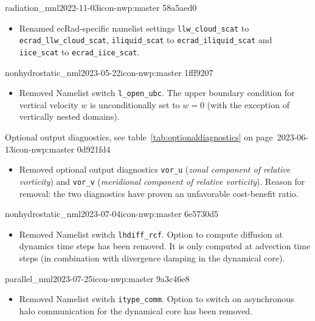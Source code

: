 \begin{changeitem}{radiation\_nml}{2022-11-03}{icon-nwp:master 58a5aed0}
  \begin{itemize}
   \item Renamed ecRad-specific namelist settings \texttt{llw\_cloud\_scat} to \texttt{ecrad\_llw\_cloud\_scat}, \texttt{iliquid\_scat} to \texttt{ecrad\_iliquid\_scat} and \texttt{iice\_scat} to \texttt{ecrad\_iice\_scat}.
  \end{itemize}
\end{changeitem}

\begin{changeitem}{nonhydrostatic\_nml}{2023-05-22}{icon-nwp:master 1fff9207}
  \begin{itemize}
   \item Removed Namelist switch \texttt{l\_open\_ubc}. The upper boundary condition for vertical velocity $w$ is unconditionally set to $w=0$ (with the exception of vertically nested domains).
  \end{itemize}
\end{changeitem}

\begin{changeitem}{Optional output diagnostics, see table~\ref{tab:optionaldiagnostics} on page~\pageref{tab:optionaldiagnostics}}{2023-06-13}{icon-nwp:master 0d921fd4}
  \begin{itemize}
   \item Removed optional output diagnostics \texttt{vor\_u} (\emph{zonal component of relative vorticity}) and \texttt{vor\_v} (\emph{meridional component of relative vorticity}).
   Reason for removal: the two diagnostics have proven an unfavorable cost-benefit ratio.
  \end{itemize}
\end{changeitem}

\begin{changeitem}{nonhydrostatic\_nml}{2023-07-04}{icon-nwp:master 6e5730d5}
  \begin{itemize}
   \item Removed Namelist switch \texttt{lhdiff\_rcf}. Option to compute diffusion at dynamics time steps has been removed. It is only computed at advection time steps (in combination with divergence damping in the dynamical core).
  \end{itemize}
\end{changeitem}

\begin{changeitem}{parallel\_nml}{2023-07-25}{icon-nwp:master 9a3c46e8}
  \begin{itemize}
   \item Removed Namelist switch \texttt{itype\_comm}. Option to switch on asynchronous halo communication for the dynamical core has been removed.
  \end{itemize}
\end{changeitem}

